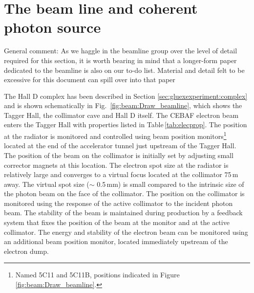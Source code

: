 \section[The beam line and coherent photon source (Stuart)]{The beam line and coherent photon source \label{sec:beamline}}
{\color{red}General comment: As we haggle in the beamline group over the level of detail required for this section, it is worth bearing in mind that a longer-form paper dedicated to the beamline is also on our to-do list.  Material and detail felt to be excessive for this document can spill over into that paper}

The Hall D complex has been described in Section \ref{sec:gluexexperiment:complex} and is shown schematically in Fig.~\ref{fig:beam:Draw_beamline}, which shows the Tagger Hall, the collimator cave and Hall D itself. The CEBAF electron beam enters the Tagger Hall with properties listed in Table\,\ref{tab:elecprop}. The position at the radiator is monitored and
controlled using beam position monitors\footnote{Named 5C11 and 5C11B, positions indicated in Figure \ref{fig:beam:Draw_beamline}.} located at the end of the accelerator tunnel just upstream of the Tagger Hall. The position of the beam on the collimator
is initially set by adjusting small corrector magnets at this location. The electron spot size at the radiator is relatively large and converges to a virtual focus located at the collimator 75\,m away. The virtual spot size ($\sim$ 0.5\,mm) is small compared to the intrinsic size of the photon beam on the face of the collimator. The position on the collimator is monitored using the response of the active collimator to the incident photon beam. The stability of the beam is maintained during production by a feedback system that fixes the position of the beam at the monitor and at the active collimator. The energy and stability of the electron beam can be monitored using an additional beam position monitor, located immediately upstream of the electron dump.

